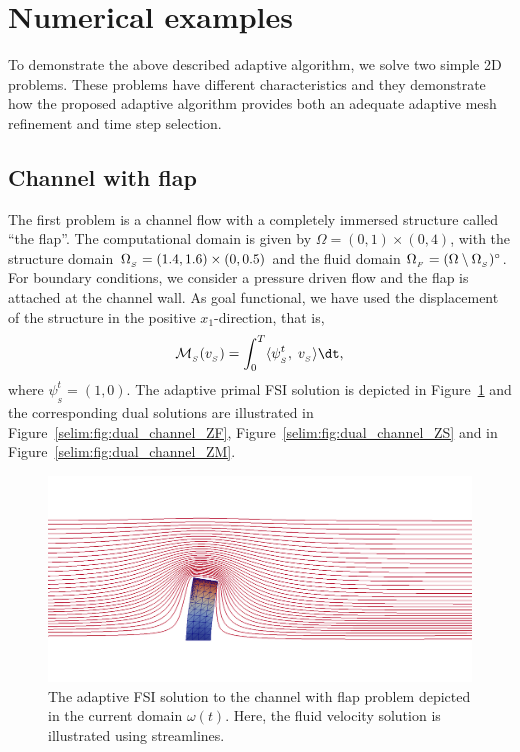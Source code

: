 \section{Numerical examples}

To demonstrate the above described adaptive algorithm, we solve two
simple 2D problems. These problems have different characteristics and
they demonstrate how the proposed adaptive algorithm provides both an
adequate adaptive mesh refinement and time step selection.

\subsection{Channel with flap}

The first problem is a channel flow with a completely immersed
structure called ``the flap''. The computational domain is given by
$\Omega = (0, 1)\times (0,4)$, with the structure domain $\Omega_{_{S}} = (1.4,
1.6)\times (0, 0.5)$ and the fluid domain $\Omega_{_{F}} = (\Omega\setminus
\Omega_{_{S}})^{\circ}$. For boundary conditions, we consider a pressure driven
flow and the flap is attached at the channel wall. As goal functional,
we have used the displacement of the structure in the positive
$x_1$-direction, that is,
\begin{equation}
\label{selim:eq:goalfunctional_channel}
\M_{_{S}}(v_{_{S}}) = \int_0^T \langle \psi^t_{_{S}},\;
v_{_{S}}\rangle \dt,
\end{equation}
where $\psi^t_{_{S}} = (1,0)$. The adaptive primal FSI solution is
depicted in Figure~\ref{selim:fig:primal_channel} and the
corresponding dual solutions are illustrated in
Figure~\ref{selim:fig:dual_channel_ZF}, Figure~\ref{selim:fig:dual_channel_ZS}
and in Figure~\ref{selim:fig:dual_channel_ZM}.
\begin{figure}
  \label{selim:fig:primal_channel}
  \caption{The adaptive FSI solution to the channel with flap problem
    depicted in the current domain $\omega(t)$. Here, the fluid
    velocity solution is illustrated using streamlines.}
  \includegraphics[width=1.0\textwidth]{chapters/selim/png/channel.png}
\end{figure}

